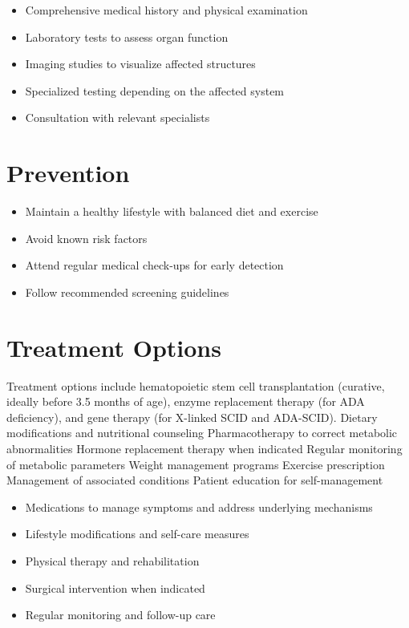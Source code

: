 \begin{itemize}[noitemsep]
  \item Comprehensive medical history and physical examination
  \item Laboratory tests to assess organ function
  \item Imaging studies to visualize affected structures
  \item Specialized testing depending on the affected system
  \item Consultation with relevant specialists
\end{itemize}
\section{Prevention}
\begin{itemize}[noitemsep]
  \item Maintain a healthy lifestyle with balanced diet and exercise
  \item Avoid known risk factors
  \item Attend regular medical check-ups for early detection
  \item Follow recommended screening guidelines
\end{itemize}
\section{Treatment Options}
Treatment options include hematopoietic stem cell transplantation (curative, ideally before 3.5 months of age), enzyme replacement therapy (for ADA deficiency), and gene therapy (for X-linked SCID and ADA-SCID). Dietary modifications and nutritional counseling Pharmacotherapy to correct metabolic abnormalities Hormone replacement therapy when indicated Regular monitoring of metabolic parameters Weight management programs Exercise prescription Management of associated conditions Patient education for self-management

\begin{itemize}[noitemsep]
  \item Medications to manage symptoms and address underlying mechanisms
  \item Lifestyle modifications and self-care measures
  \item Physical therapy and rehabilitation
  \item Surgical intervention when indicated
  \item Regular monitoring and follow-up care
\end{itemize}
